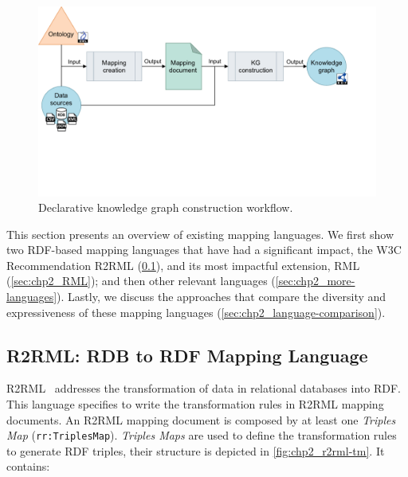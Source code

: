 \begin{figure}[h]
\centering
\includegraphics[width=0.9\linewidth]{figures/chp2_kgc-workflow.pdf}
\caption[Declarative knowledge graph construction workflow]{Declarative knowledge graph construction workflow.}
\label{fig:chp2_kgc-workflow}
\end{figure}

This section presents an overview of existing mapping languages. We first show two RDF-based mapping languages that have had a significant impact, the W3C Recommendation R2RML (\cref{sec:chp2_R2RML}), and its most impactful extension, RML (\cref{sec:chp2_RML}); and then other relevant languages (\cref{sec:chp2_more-languages}). Lastly, we discuss the approaches that compare the diversity and expressiveness of these mapping languages (\cref{sec:chp2_language-comparison}).






\subsection{R2RML: RDB to RDF Mapping Language}
\label{sec:chp2_R2RML}

R2RML~\parencite{das2012r2rml} addresses the transformation of data in relational databases into RDF. This language specifies to write the transformation rules in R2RML mapping documents. An R2RML mapping document is composed by at least one \textit{Triples Map} (\texttt{rr:TriplesMap}). \textit{Triples Maps} are used to define the transformation rules to generate RDF triples, their structure is depicted in \cref{fig:chp2_r2rml-tm}. It contains:

